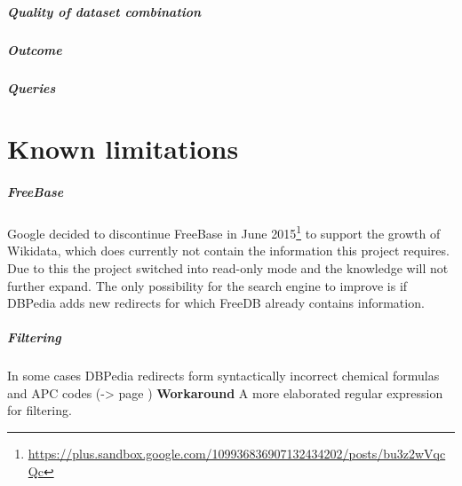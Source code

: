 \documentclass[11pt,titlepage,oneside,openany]{book}
\begin{document}
\paragraph{Quality of dataset combination}
\label{cha:example}

\paragraph{Outcome}
\label{sec:outcome}

\paragraph{Queries}
\label{sec:query}



\label{ex:ecotrin}


\chapter{Known limitations}
\label{cha:limiations}



\label{prob:freebase}

\paragraph{FreeBase}
Google decided to discontinue FreeBase in June 2015\footnote{\url{https://plus.sandbox.google.com/109936836907132434202/posts/bu3z2wVqcQc}} to support the growth of Wikidata, which does currently not contain the information this project requires. Due to this the project switched into read-only mode and the knowledge will not further expand. The only possibility for the search engine to improve is if DBPedia adds new redirects for which FreeDB already contains information. 

\paragraph{Filtering}
In some cases DBPedia redirects form syntactically incorrect chemical formulas and APC codes (-> page \pageref{sec:filtering}) \textbf{Workaround} A more elaborated regular expression for filtering.
\end{document}
